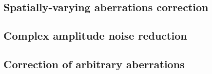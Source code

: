 \subsection{Spatially-varying aberrations correction}

\subsection{Complex amplitude noise reduction}

\subsection{Correction of arbitrary aberrations}